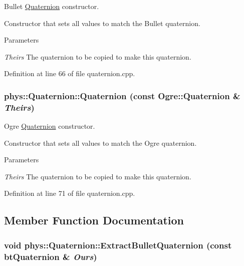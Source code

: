 Bullet \hyperlink{classphys_1_1Quaternion}{Quaternion} constructor. 

Constructor that sets all values to match the Bullet quaternion. 
\begin{DoxyParams}{Parameters}
\item[{\em Theirs}]The quaternion to be copied to make this quaternion. \end{DoxyParams}


Definition at line 66 of file quaternion.cpp.

\hypertarget{classphys_1_1Quaternion_a4902c05489ebae03a55433d947c53d03}{
\subsubsection[{Quaternion}]{\setlength{\rightskip}{0pt plus 5cm}phys::Quaternion::Quaternion (const Ogre::Quaternion \& {\em Theirs})}}
\label{df/d8c/classphys_1_1Quaternion_a4902c05489ebae03a55433d947c53d03}


Ogre \hyperlink{classphys_1_1Quaternion}{Quaternion} constructor. 

Constructor that sets all values to match the Ogre quaternion. 
\begin{DoxyParams}{Parameters}
\item[{\em Theirs}]The quaternion to be copied to make this quaternion. \end{DoxyParams}


Definition at line 71 of file quaternion.cpp.



\subsection{Member Function Documentation}
\hypertarget{classphys_1_1Quaternion_a10d3582b2731e70279d7bab43173f317}{
\subsubsection[{ExtractBulletQuaternion}]{\setlength{\rightskip}{0pt plus 5cm}void phys::Quaternion::ExtractBulletQuaternion (const btQuaternion \& {\em Ours})}}
\label{df/d8c/classphys_1_1Quaternion_a10d3582b2731e70279d7bab43173f317}


